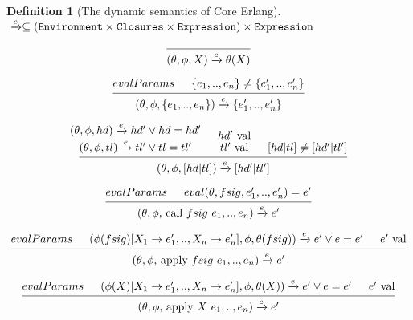 \documentclass[12pt]{article}
\theoremstyle{definition}
\newtheorem{definition}{Definition}[section]
\newcommand{\ose}{\xrightarrow{e}}
\numberwithin{equation}{section}
\begin{document}
\begin{definition}[The dynamic semantics of Core Erlang]
$\\\ose \subseteq (\verb|Environment| \times \verb|Closures| \times \verb|Expression|) \times  \verb|Expression|$ 

\begin{center}
	\begin{equation}
		\begin{prooftree}
			\infer0{(\theta, \phi, X) \ose \theta(X)}
		\end{prooftree}
		\label{OS:var}
	\end{equation}
	
	\begin{equation}
		\begin{prooftree}
			\hypo{evalParams}
			\hypo{\{e_1, .., e_n\} \neq \{e_1', .., e_n'\} }
			\infer2{(\theta, \phi, \{ e_1, .., e_n \}) \ose \{ e_1', .., e_n' \}}
		\end{prooftree}
		\label{OS:tuple}
	\end{equation}
	
	\begin{equation}
		\begin{prooftree}
			\hypo{(\theta, \phi, hd) \ose hd' \lor hd = hd'}
			\infer[no rule]1{(\theta, \phi, tl) \ose tl' \lor tl = tl'}
			\hypo{hd'$ val$}
			\infer[no rule]1{tl'$ val$}
			\hypo{[hd |tl] \neq [hd' |tl']}
			\infer3{(\theta, \phi, [hd |tl]) \ose [hd'| tl']}
		\end{prooftree}
		\label{OS:list}
	\end{equation}
	
	\begin{equation}
		\begin{prooftree}
			\hypo{evalParams}
			\hypo{eval(\theta, fsig, e_1', .., e_n') = e'}
			\infer2{(\theta, \phi,$ call $fsig\ e_1, .., e_n) \ose e'}
		\end{prooftree}
		\label{OS:call}
	\end{equation}
	
	\begin{equation}
		\begin{prooftree}
			\hypo{evalParams}
			\hypo{(\phi(fsig)[X_1 \rightarrow e_1', .., X_n \rightarrow e_n'], \phi, \theta(fsig)) \ose e' \lor e = e'}
			\hypo{e'$ val$}
			\infer3{(\theta, \phi,$ apply $fsig\ e_1, .., e_n) \ose e'}
		\end{prooftree}
		\label{OS:top}
	\end{equation}
	
	\begin{equation}
		\begin{prooftree}
			\hypo{evalParams}
			\hypo{(\phi(X)[X_1 \rightarrow e_1', .., X_n \rightarrow e_n'], \phi, \theta(X)) \ose e' \lor e = e'}
			\hypo{e'$ val$}
			\infer3{(\theta, \phi, $ apply $X\ e_1, .., e_n) \ose e'}
		\end{prooftree}
		\label{OS:apply}
	\end{equation}
	

\end{center}
\end{definition}
\end{document}
